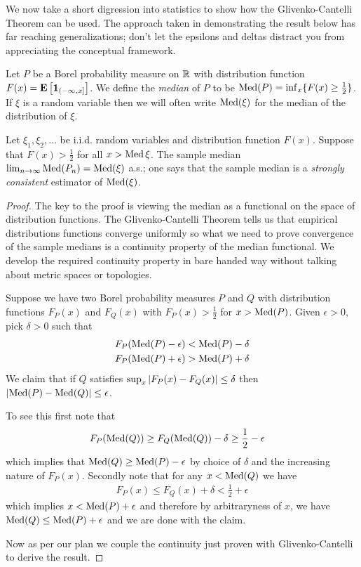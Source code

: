 We now take a short digression into statistics to show how the
Glivenko-Cantelli Theorem can be used.  The approach taken in
demonstrating the result below has far reaching generalizations;
don't let the epsilons and deltas distract you from appreciating the
conceptual framework.
\begin{defn}Let $P$ be a Borel probability measure on $\mathbb{R}$ with
  distribution function $F(x) =
  \textbf{E}\left[\textbf{1}_{(-\infty,x]}\right]$.  We define the
    \emph{median} of $P$ to be $\operatorname*{Med}(P) = \inf_x \lbrace F(x) \geq
    \frac{1}{2} \rbrace$.  If $\xi$ is a random variable then we will
    often write $\operatorname*{Med}(\xi)$ for the median of the distribution of $\xi$.
\end{defn}

\begin{lem}Let $\xi_1, \xi_2, \dots$ be i.i.d. random variables and
  distribution function $F(x)$.  Suppose that $F(x) > \frac{1}{2}$ for
  all $x > \operatorname*{Med}{\xi}$.   The sample median $\lim_{n \to \infty}
  \operatorname*{Med}(P_n) = \operatorname*{Med}(\xi)$ a.s.; one says that the sample median is a
  \emph{strongly consistent} estimator of $\operatorname*{Med}(\xi)$.
\end{lem}
\begin{proof}
The key to the proof is viewing the median as a functional on the
space of distribution functions.  The Glivenko-Cantelli Theorem tells
us that empirical distributions functions converge uniformly so what
we need to prove convergence of the sample medians is a continuity
property of the median functional.  We develop the required continuity
property in bare handed way without talking about metric spaces or
topologies.

Suppose we have two Borel probability measures $P$ and $Q$ with
distribution functions $F_P(x)$ and $F_Q(x)$ with $F_P(x) >
\frac{1}{2}$ for $x > \operatorname*{Med}(P)$.  Given $\epsilon > 0$, pick 
$\delta > 0$ such that 
\begin{align*}
F_P(\operatorname*{Med}(P) - \epsilon) &< \operatorname*{Med}(P) - \delta \\
F_P(\operatorname*{Med}(P) + \epsilon) &> \operatorname*{Med}(P) + \delta \\
\end{align*}
We claim that if $Q$ satisfies $\sup_x \left \vert F_P(x) - F_Q(x) \right \vert \leq
\delta$ then $\left \vert \operatorname*{Med}(P) - \operatorname*{Med}(Q) \right \vert \leq \epsilon$.

To see this first note that 
\begin{align*}
F_P(\operatorname*{Med}(Q)) &\geq F_Q(\operatorname*{Med}(Q)) - \delta \geq \frac{1}{2} - \epsilon
\end{align*}
which implies that $\operatorname*{Med}(Q) \geq \operatorname*{Med}(P) - \epsilon$ by choice
of $\delta$ and the increasing nature of $F_P(x)$.
Secondly note that for any $x < \operatorname*{Med}(Q)$ we have
\begin{align*}
F_P(x) \leq F_Q(x) + \delta < \frac{1}{2} + \epsilon
\end{align*}
which implies $x < \operatorname*{Med}(P) + \epsilon$ and therefore by
arbitraryness of $x$, we have $\operatorname*{Med}(Q) \leq \operatorname*{Med}(P) + \epsilon$
and we are done with the claim.

Now as per our plan we couple the continuity just proven with
Glivenko-Cantelli to derive the result.
\end{proof}

